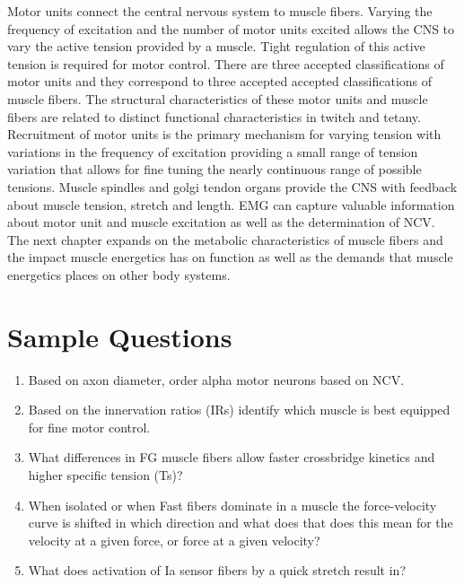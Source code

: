 Motor units connect the central nervous system to muscle fibers. Varying the frequency of excitation and the number of motor units excited allows the CNS to vary the active tension provided by a muscle. Tight regulation of this active tension is required for motor control. There are three accepted classifications of motor units and they correspond to three accepted accepted classifications of muscle fibers. The structural characteristics of these motor units and muscle fibers are related to distinct functional characteristics in twitch and tetany. Recruitment of motor units is the primary mechanism for varying tension with variations in the frequency of excitation providing a small range of tension variation that allows for fine tuning the nearly continuous range of possible tensions. Muscle spindles and golgi tendon organs provide the CNS with feedback about muscle tension, stretch and length. EMG can capture valuable information about motor unit and muscle excitation as well as the determination of NCV. The next chapter expands on the metabolic characteristics of muscle fibers and the impact muscle energetics has on function as well as the demands that muscle energetics places on other body systems.

\printbibliography[heading=subbibintoc]

\section*{Sample Questions}

\begin{enumerate}
    \item Based on axon diameter, order alpha motor neurons based on NCV.
    \item Based on the innervation ratios (IRs) identify which muscle is best equipped for fine motor control.
    \item What differences in FG muscle fibers allow faster crossbridge kinetics and higher specific tension (Ts)?
    \item When isolated or when Fast fibers dominate in a muscle the force-velocity curve is shifted in which direction and what does that does this mean for the velocity at a given force, or force at a given velocity?
    \item What does activation of Ia sensor fibers by a quick stretch result in?
\end{enumerate} 